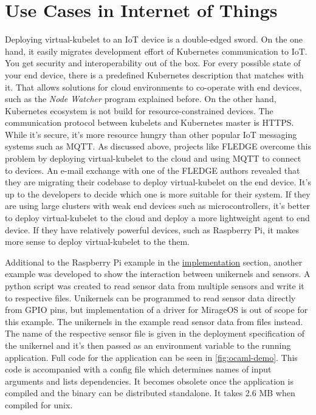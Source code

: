 \section{Use Cases in Internet of Things}

Deploying virtual-kubelet to an IoT device is a double-edged sword. On the one hand, it easily migrates development effort of Kubernetes communication to IoT. You get security and interoperability out of the box. For every possible state of your end device, there is a predefined Kubernetes description that matches with it. That allows solutions for cloud environments to co-operate with end devices, such as the \textit{Node Watcher} program explained before. On the other hand, Kubernetes ecosystem is not build for resource-constrained devices. The communication protocol between kubelets and Kubernetes master is HTTPS. While it's secure, it's more resource hungry than other popular IoT messaging systems such as MQTT. As discussed above, projects like FLEDGE overcome this problem by deploying virtual-kubelet to the cloud and using MQTT to connect to devices. An e-mail exchange with one of the FLEDGE authors revealed that they are migrating their codebase to deploy virtual-kubelet on the end device. It's up to the developers to decide which one is more suitable for their system. If they are using large clusters with weak end devices such as microcontrollers, it's better to deploy virtual-kubelet to the cloud and deploy a more lightweight agent to end device. If they have relatively powerful devices, such as Raspberry Pi, it makes more sense to deploy virtual-kubelet to the them.

Additional to the Raspberry Pi example in the \hyperref[chapter:implementation]{implementation} section, another example was developed to show the interaction between unikernels and sensors. A python script was created to read sensor data from multiple sensors and write it to respective files. Unikernels can be programmed to read sensor data directly from GPIO pins, but implementation of a driver for MirageOS is out of scope for this example. The unikernels in the example read sensor data from files instead. The name of the respective sensor file is given in the deployment specification of the unikernel and it's then passed as an environment variable to the running application. Full code for the application can be seen in \ref{fig:ocaml-demo}. This code is accompanied with a config file which determines names of input arguments and lists dependencies. It becomes obsolete once the application is compiled and the binary can be distributed standalone. It takes 2.6 MB when compiled for unix.

